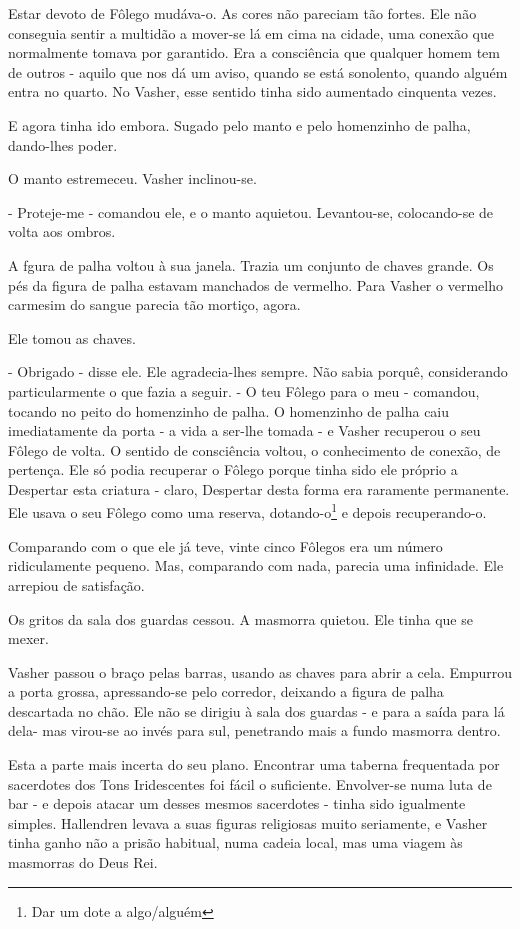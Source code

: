 \documentclass[11pt,a4paper]{book}
\begin{document}
 Estar devoto de Fôlego mudáva-o.  As cores não pareciam tão fortes. Ele não conseguia sentir a multidão a mover-se lá em cima na cidade, uma conexão que normalmente tomava por garantido. Era a consciência que qualquer homem tem de outros - aquilo que nos dá um aviso, quando se está sonolento, quando alguém entra no quarto. No Vasher, esse sentido tinha sido aumentado cinquenta vezes. 
 
 E agora tinha ido embora. Sugado pelo manto e pelo homenzinho de palha, dando-lhes poder.
 
 O manto estremeceu. Vasher inclinou-se.
 
 - Proteje-me - comandou ele, e o manto aquietou. Levantou-se, colocando-se de volta aos ombros.
 
 A fgura de palha voltou à sua janela. Trazia um conjunto de chaves grande. Os pés da figura de palha estavam manchados de vermelho. Para Vasher o vermelho carmesim do sangue parecia tão mortiço, agora.
 
 Ele tomou as chaves.
 
 - Obrigado - disse ele. Ele agradecia-lhes sempre. Não sabia porquê, considerando particularmente o que fazia a seguir. - O teu Fôlego para o meu - comandou, tocando no peito do homenzinho de palha. O homenzinho de palha caiu imediatamente da porta - a vida a ser-lhe tomada - e Vasher recuperou o seu Fôlego de volta. O sentido de consciência voltou, o conhecimento de conexão, de pertença. Ele só podia recuperar o Fôlego porque tinha sido ele próprio a Despertar esta criatura - claro, Despertar desta forma era raramente permanente. Ele usava o seu Fôlego como uma reserva, dotando-o\footnote{Dar um dote a algo/alguém} e depois recuperando-o.

 Comparando com o que ele já teve, vinte cinco Fôlegos era um número ridiculamente pequeno. Mas, comparando com nada, parecia uma infinidade. Ele arrepiou de satisfação.
 
 Os gritos da sala dos guardas cessou. A masmorra quietou. Ele tinha que se mexer.
 
 Vasher passou o braço pelas barras, usando as chaves para abrir a cela. Empurrou a porta grossa, apressando-se pelo corredor, deixando a figura de palha descartada no chão. Ele não se dirigiu à sala dos guardas - e para a saída para lá dela- mas virou-se ao invés para sul, penetrando mais a fundo masmorra dentro.

Esta a parte mais incerta do seu plano. Encontrar uma taberna frequentada por sacerdotes dos Tons Iridescentes foi fácil o suficiente. Envolver-se numa luta de bar - e depois atacar um desses mesmos sacerdotes - tinha sido igualmente simples. Hallendren levava a suas figuras religiosas muito seriamente, e Vasher tinha ganho não a prisão habitual, numa cadeia local, mas uma viagem às masmorras do Deus Rei.
\end{document}
